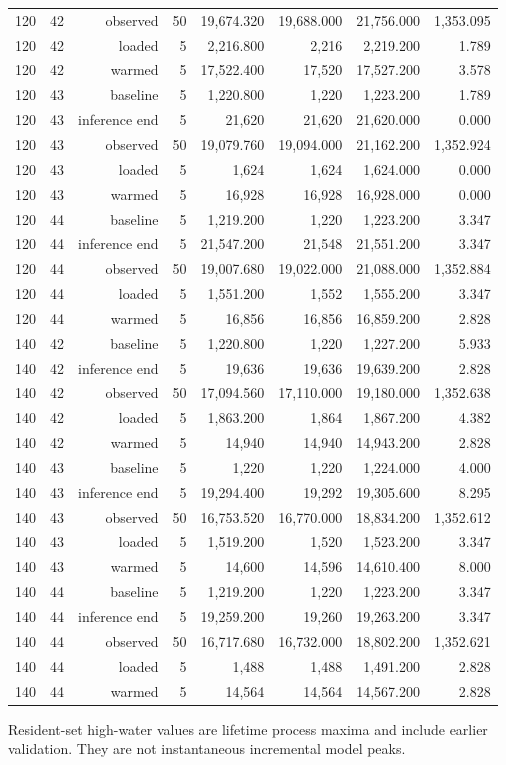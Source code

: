 \documentclass[10pt,a4paper]{article}
\begin{document}
\begin{longtable}{@{}lrrrrrrr@{}}
120 & 42 & observed & 50 & 19,674.320 & 19,688.000 & 21,756.000 & 1,353.095 \\
120 & 42 & loaded & 5 & 2,216.800 & 2,216 & 2,219.200 & 1.789 \\
120 & 42 & warmed & 5 & 17,522.400 & 17,520 & 17,527.200 & 3.578 \\
120 & 43 & baseline & 5 & 1,220.800 & 1,220 & 1,223.200 & 1.789 \\
120 & 43 & inference end & 5 & 21,620 & 21,620 & 21,620.000 & 0.000 \\
120 & 43 & observed & 50 & 19,079.760 & 19,094.000 & 21,162.200 & 1,352.924 \\
120 & 43 & loaded & 5 & 1,624 & 1,624 & 1,624.000 & 0.000 \\
120 & 43 & warmed & 5 & 16,928 & 16,928 & 16,928.000 & 0.000 \\
120 & 44 & baseline & 5 & 1,219.200 & 1,220 & 1,223.200 & 3.347 \\
120 & 44 & inference end & 5 & 21,547.200 & 21,548 & 21,551.200 & 3.347 \\
120 & 44 & observed & 50 & 19,007.680 & 19,022.000 & 21,088.000 & 1,352.884 \\
120 & 44 & loaded & 5 & 1,551.200 & 1,552 & 1,555.200 & 3.347 \\
120 & 44 & warmed & 5 & 16,856 & 16,856 & 16,859.200 & 2.828 \\
140 & 42 & baseline & 5 & 1,220.800 & 1,220 & 1,227.200 & 5.933 \\
140 & 42 & inference end & 5 & 19,636 & 19,636 & 19,639.200 & 2.828 \\
140 & 42 & observed & 50 & 17,094.560 & 17,110.000 & 19,180.000 & 1,352.638 \\
140 & 42 & loaded & 5 & 1,863.200 & 1,864 & 1,867.200 & 4.382 \\
140 & 42 & warmed & 5 & 14,940 & 14,940 & 14,943.200 & 2.828 \\
140 & 43 & baseline & 5 & 1,220 & 1,220 & 1,224.000 & 4.000 \\
140 & 43 & inference end & 5 & 19,294.400 & 19,292 & 19,305.600 & 8.295 \\
140 & 43 & observed & 50 & 16,753.520 & 16,770.000 & 18,834.200 & 1,352.612 \\
140 & 43 & loaded & 5 & 1,519.200 & 1,520 & 1,523.200 & 3.347 \\
140 & 43 & warmed & 5 & 14,600 & 14,596 & 14,610.400 & 8.000 \\
140 & 44 & baseline & 5 & 1,219.200 & 1,220 & 1,223.200 & 3.347 \\
140 & 44 & inference end & 5 & 19,259.200 & 19,260 & 19,263.200 & 3.347 \\
140 & 44 & observed & 50 & 16,717.680 & 16,732.000 & 18,802.200 & 1,352.621 \\
140 & 44 & loaded & 5 & 1,488 & 1,488 & 1,491.200 & 2.828 \\
140 & 44 & warmed & 5 & 14,564 & 14,564 & 14,567.200 & 2.828 \\
\end{longtable}\endgroup
Resident-set high-water values are lifetime process maxima and include earlier validation. They are not instantaneous incremental model peaks.
\end{document}
